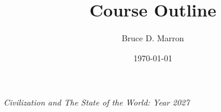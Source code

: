 \documentclass[12pt, letterpaper]{article}
\title{\vspace{-15mm}\fontsize{14pt}{10pt}
                    \selectfont \textbf{Course Outline}   %
                    \vspace{-7mm}
      }
\author{
     \normalsize Bruce D. Marron \\                     %
     \vspace{-5mm}
}
\date{\normalsize \today}
\begin{document}
\begin{singlespacing}
\end{singlespacing}
\thispagestyle{fancy}                           %



\large
\begin{flushleft}
\textit{Civilization and The State of the World: Year 2027}
\end{flushleft}
\end{document}
